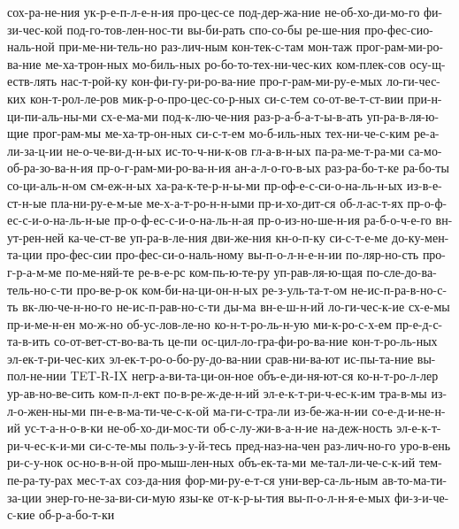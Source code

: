 {    сох-ра-не-ния
    ук-р-е-п-л-е-н-ия
    про-цес-се
    под-дер-жа-ние
    не-об-хо-ди-мо-го
    фи-зи-чес-кой
    под-го-тов-лен-нос-ти
    вы-би-рать
    спо-со-бы
    ре-ше-ния
    про-фес-сио-наль-ной
    при-ме-ни-тель-но
    раз-лич-ным
    кон-тек-с-там
    мон-таж
    прог-рам-ми-ро-ва-ние
    ме-ха-трон-ных
    мо-биль-ных
    ро-бо-то-тех-ни-чес-ких
    ком-плек-сов
    осу-щ-еств-лять
    нас-т-рой-ку
    кон-фи-гу-ри-ро-ва-ние
    про-г-рам-ми-ру-е-мых
    ло-ги-чес-ких
    кон-т-рол-ле-ров
    мик-р-о-про-цес-со-р-ных
    си-с-тем
    со-от-ве-т-ст-вии
    при-н-ци-пи-аль-ны-ми
    сх-е-ма-ми
    под-к-лю-че-ния
    раз-р-а-б-а-т-ы-в-ать
    уп-ра-в-ля-ю-щие
    прог-рам-мы
    ме-ха-тр-он-ных
    си-с-т-ем
    мо-б-иль-ных
    тех-ни-че-с-ким
    ре-а-ли-за-ц-ии
    не-о-че-ви-д-н-ых
    ис-то-ч-ни-к-ов
    гл-а-в-н-ых
    па-ра-ме-т-ра-ми
    са-мо-об-ра-зо-ва-н-ия
    пр-о-г-рам-ми-ро-ва-н-ия
    ан-а-л-о-го-в-ых
    раз-ра-бо-т-ке
    ра-бо-ты
    со-ци-аль-н-ом
    см-еж-н-ых
    ха-ра-к-те-р-н-ы-ми
    пр-оф-е-с-си-о-на-ль-н-ых
    из-в-е-ст-н-ые
    пла-ни-ру-е-м-ые
    ме-х-а-т-ро-н-н-ыми
    пр-и-хо-дит-ся
    об-л-ас-т-ях
    пр-о-ф-ес-с-и-о-на-ль-н-ые
    пр-о-ф-ес-с-и-о-на-ль-н-ая
    пр-о-из-но-ше-н-ия
    ра-б-о-ч-е-го
    вн-ут-рен-ней
    ка-че-ст-ве
    уп-ра-в-ле-ния
    дви-же-ния
    кн-о-п-ку
    си-с-т-е-ме
    до-ку-мен-та-ции
    про-фес-сии
    про-фес-си-о-наль-ному
    вы-п-о-л-н-е-н-ии
    по-ляр-но-сть
    про-г-р-а-м-ме
    по-ме-няй-те
    ре-в-е-рс
    ком-пь-ю-те-ру
    уп-рав-ля-ю-щая
    по-сле-до-ва-тель-но-с-ти
    про-ве-р-ок
    ком-би-на-ци-он-н-ых
    ре-з-уль-та-т-ом
    не-ис-п-ра-в-но-с-ть
    вк-лю-че-н-но-го
    не-ис-п-рав-но-с-ти
    ды-ма
    вн-е-ш-н-ий
    ло-ги-чес-к-ие
    сх-е-мы
    пр-и-ме-н-ен
    мо-ж-но
    об-ус-лов-ле-но
    ко-н-т-ро-ль-н-ую
    ми-к-ро-с-х-ем
    пр-е-д-с-та-в-ить
    со-от-вет-ст-во-ва-ть
    це-пи
    ос-цил-ло-гра-фи-ро-ва-ние
    кон-т-ро-ль-ных
    эл-ек-т-ри-чес-ких
    эл-ек-т-ро-о-бо-ру-до-ва-нии
    срав-ни-ва-ют
    ис-пы-та-ние
    вы-пол-не-нии
    TET-R-IX
    негр-а-ви-та-ци-он-ное
    объ-е-ди-ня-ют-ся
    ко-н-т-ро-л-лер
    ур-ав-но-ве-сить
    ком-п-л-ект
    по-в-ре-ж-де-н-ий
    эл-е-к-т-ри-ч-ес-к-им
    тра-в-мы
    из-л-о-жен-ны-ми
    пн-е-в-ма-ти-че-с-к-ой
    ма-ги-с-тра-ли
    из-бе-жа-н-ии
    со-е-д-и-не-н-ий
    ус-т-а-н-о-в-ки
    не-об-хо-ди-мос-ти
    об-с-лу-жи-в-а-н-ие
    на-деж-ность
    эл-е-к-т-ри-ч-ес-к-и-ми
    си-с-те-мы
    поль-з-у-й-тесь
    пред-наз-на-чен
    раз-лич-но-го
    уро-в-ень
    ри-с-у-нок
    ос-но-в-н-ой
    про-мыш-лен-ных
    объ-ек-та-ми
    ме-тал-ли-че-с-к-ий
    тем-пе-ра-ту-рах
    мес-т-ах
    соз-да-ния
    фор-ми-ру-е-т-ся
    уни-вер-са-ль-ным
    ав-то-ма-ти-за-ции
    энер-го-не-за-ви-си-мую
    язы-ке
    от-к-р-ы-тия
    вы-п-о-л-н-я-е-мых
    фи-з-и-че-с-кие
    об-р-а-бо-т-ки
    }